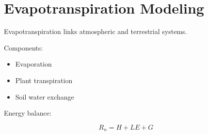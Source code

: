 \section{Evapotranspiration Modeling}


Evapotranspiration links atmospheric and terrestrial systems.



Components:


\begin{itemize}

\item Evaporation

\item Plant transpiration

\item Soil water exchange

\end{itemize}



Energy balance:


\[
R_n=H+LE+G
\]

